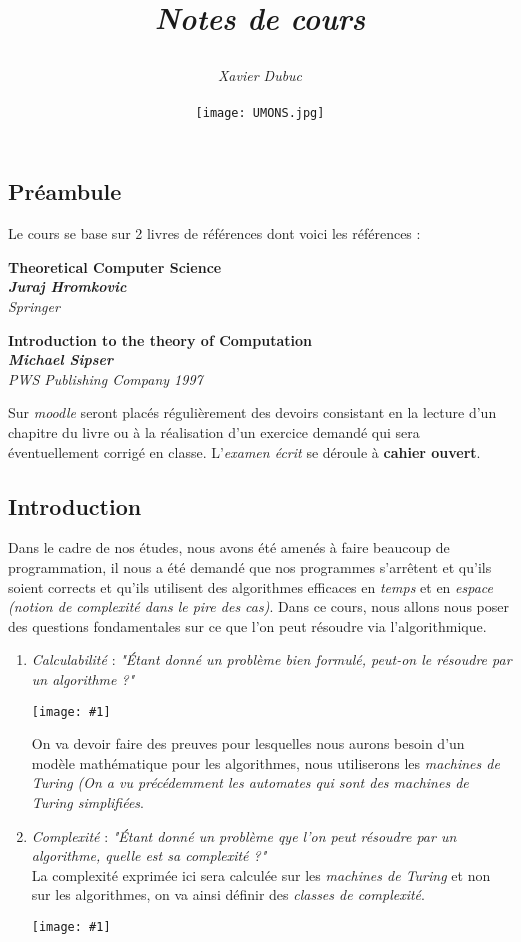 \documentclass{article}
\title{$ $\\ $ $\\ $ $\\ $ $\\ $ $\\ $ $\\ $ $\\\begin{Huge}\maintitlecolor{Calculabilité \& Complexité}\end{Huge} \\ 
	   $ $ \\ \begin{LARGE}\textit{Notes de cours}\end{LARGE}}
\author{\textit{Xavier Dubuc} \\ \blu{Xavier.DUBUC@student.umons.ac.be} \\ $ $\\ $ $\\ $ $\\ $ $\\ $ $\\ $ $\\ $ $\\ $ 
$ \\ 
\texttt{[image: UMONS.jpg]}}
\date{}
\newcommand{\titre}[1]{\textcolor{title}{#1}}
\newcommand{\tsect}[1]{\titre{\section{#1}}}
\newcommand{\term}[1]{\textit{\textcolor{maintitle}{#1}}}
\newcommand{\imgR}[2]{\begin{center}\texttt{[image: \#1]}\end{center}}
\begin{document}
\begin{sffamily}

\maketitle

\newpage

\tableofcontents

\hbox{\raisebox{0.4em}{\vrule depth 0.4pt height 0.4pt width 10cm}}

\newpage

\tsect{Préambule}

Le cours se base sur 2 livres de références dont voici les références :
\begin{center}
\textbf{Theoretical Computer Science} \\
\textbf{\term{Juraj Hromkovic}} \\
\textit{Springer}
\end{center}

\begin{center}
\textbf{Introduction to the theory of Computation} \\
\textbf{\term{Michael Sipser}} \\
\textit{PWS Publishing Company 1997}
\end{center}

Sur \term{moodle} seront placés régulièrement des devoirs consistant en la lecture d'un chapitre du livre ou à la 
réalisation d'un exercice demandé qui sera éventuellement corrigé en classe.
L'\term{examen écrit} se déroule à \textbf{cahier ouvert}.

\tsect{Introduction}

Dans le cadre de nos études, nous avons été amenés à faire beaucoup de programmation, il nous a été demandé que nos 
programmes s'arrêtent et qu'ils soient corrects et qu'ils utilisent des algorithmes efficaces en \term{temps} et en
\term{espace} \textit{(notion de complexité dans le pire des cas)}. Dans ce cours, nous allons nous poser des questions 
fondamentales sur ce que l'on peut résoudre via l'algorithmique.
\begin{enumerate}
\item \term{Calculabilité} : \textit{"Étant donné un problème bien formulé, peut-on le résoudre par un algorithme ?"}\\
\imgR{img1.png}{200}
On va devoir faire des preuves pour lesquelles nous aurons besoin d'un modèle mathématique pour les algorithmes, nous 
utiliserons les \term{machines de Turing} \textit{(On a vu précédemment les automates qui sont des machines de Turing 
simplifiées}.
\item \term{Complexité} : \textit{"Étant donné un problème qye l'on peut résoudre par un algorithme, quelle est sa 
complexité ?"}\\
La complexité exprimée ici sera calculée sur les \term{machines de Turing} et non sur les algorithmes, on va ainsi 
définir des \term{classes de complexité}.
\imgR{img2.png}{200}
\end{enumerate}


\end{sffamily}
\end{document}
